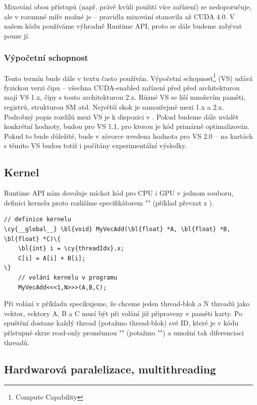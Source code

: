     Mixování obou přístupů (např. právě kvůli použití více zařízení) se nedoporučuje, ale v rozumné míře možné je -- pravidla mixování stanovila až CUDA 4.0. V našem kódu používáme výhradně Runtime API, proto se dále budeme zabývat pouze jí.

    \subsubsection{Výpočetní schopnost}

    Tento termín bude dále v textu často používán. Výpočetní schopnost\footnote{Compute Capability} (VS) udává fyzickou verzi čipu -- všechna CUDA-enabled zařízení před před architekturou \FERMI mají VS 1.x, čipy s touto architekturou 2.x. Různé VS se liší množsvím paměti, registrů, strukturou SM atd. Největší skok je samozřejmě mezi 1.x a 2.x. Podrobný popis rozdílů mezi VS je k dispozici v \cite[přílohy]{CUDA programming g.}. Pokud budeme dále uvádět konkrétní hodnoty, budou pro VS 1.1, pro kterou je kód primárně optimalizován. Pokud to bude důležité, bude v závorce uvedena hodnota pro VS 2.0 -- na kartách s těmito VS budou totiž i počítány experimentální výsledky.

    \subsection{Kernel}

    Runtime API nám dovoluje míchat kód pro CPU i GPU v jednom souboru, definici kernelu proto rozlišíme specifikátorem
    \Vr"" (příklad převzat z \cite{CUDA programming g.}).

    \begin{Verbatim}[commandchars = \\\{\}]
    // definice kernelu
\cy{__global__} \bl{void} MyVecAdd(\bl{float} *A, \bl{float} *B, \bl{float} *C)\{
    \bl{int} i = \cy{threadIdx}.x;
    C[i] = A[i] + B[i];
\}
    // volání kernelu v programu
    MyVecAdd<<<1,N>>>(A,B,C);
    \end{Verbatim}

    Při volání v příkladu specikujeme, že chceme jeden thread-blok a N threadů jako vektor, vektory A, B a C musí být při volání již připraveny v paměti karty. Po spuštění dostane každý thread (potažmo thread-blok) své ID, které je v kódu přístupné skrze read-only proměnnou \Vr"" (potažmo \Vr"") a umožní tak diferenciaci threadů.

    \subsection{Hardwarová paralelizace, multithreading}

